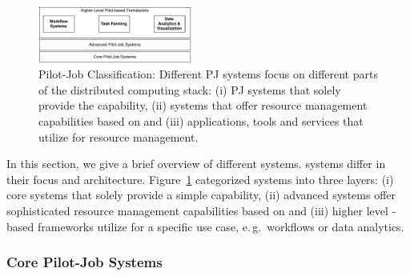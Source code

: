 \documentclass{sig-alternate}
\begin{document}

\begin{figure}[t]
	\centering
		\includegraphics[width=0.45\textwidth]{figures/classification}
	\caption{Pilot-Job Classification: Different PJ systems focus
          on different parts of the distributed computing stack: (i)
          PJ systems that solely provide the \pilot capability, (ii)
          systems that offer resource management capabilities based on
          \pilots and (iii) applications, tools and services that
          utilize \pilots for resource management. }  
	\label{fig:figures_classification}
\end{figure}

In this section, we give a brief overview of different \pilotjob systems.
\pilotjob systems differ in their focus and architecture.
Figure~\ref{fig:figures_classification} categorized \pilotjob systems into
three layers: (i) core \pilotjob systems that solely provide a simple \pilot
capability, (ii) advanced \pilotjob systems offer sophisticated resource
management capabilities based on \pilots and (iii) higher level \pilot-based
frameworks utilize \pilots for a specific use case, e.\,g.\ workflows or data
analytics.


\subsubsection{Core Pilot-Job Systems}
\end{document}
